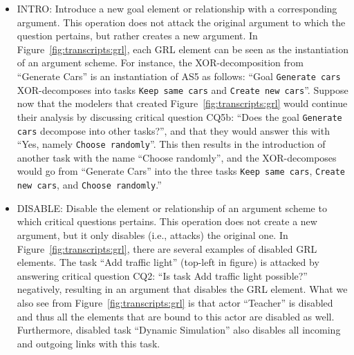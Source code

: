 \begin{itemize} 
\item \textsf{INTRO}: Introduce a new goal element or relationship with a corresponding argument. This operation does not attack the original argument to which the question pertains, but rather creates a new argument. In Figure~\ref{fig:transcripts:grl}, each GRL element can be seen as the instantiation of an argument scheme. For instance, the XOR-decomposition from ``Generate Cars'' is an instantiation of AS5 as follows: ``Goal \texttt{Generate cars} XOR-decomposes into tasks \texttt{Keep same cars} and \texttt{Create new cars}''. Suppose now that the modelers that created Figure~\ref{fig:transcripts:grl} would continue their analysis by discussing critical question CQ5b: ``Does the goal \texttt{Generate cars} decompose into other tasks?'', and that they would answer this with ``Yes, namely \texttt{Choose randomly}''. This then results in the introduction of another task with the name ``Choose randomly'', and the XOR-decomposes would go from ``Generate Cars'' into the three tasks \texttt{Keep same cars}, \texttt{Create new cars}, and \texttt{Choose randomly}.'' %
\item \textsf{DISABLE:} Disable the element or relationship of an argument scheme to which critical questions pertains. This operation does not create a new argument, but it only disables (i.e., attacks) the original one. In Figure~\ref{fig:transcripts:grl}, there are several examples of disabled GRL elements. The task ``Add traffic light'' (top-left in figure) is attacked by answering critical question CQ2: ``Is task Add traffic light possible?'' negatively, resulting in an argument that disables the GRL element. What we also see from Figure~\ref{fig:transcripts:grl} is that actor ``Teacher'' is disabled and thus all the elements that are bound to this actor are disabled as well. Furthermore, disabled task ``Dynamic Simulation'' also disables all incoming and outgoing links with this task.


\end{itemize}
